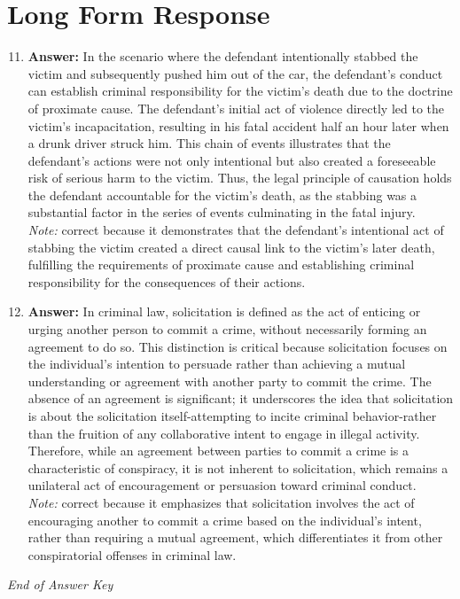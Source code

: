 \documentclass[12pt]{article}
\begin{document}
\section*{Long Form Response}
\begin{enumerate}[label=\arabic*.]
\setcounter{enumi}{10}
\item \textbf{Answer:} In the scenario where the defendant intentionally stabbed the victim and subsequently pushed him out of the car, the defendant's conduct can establish criminal responsibility for the victim's death due to the doctrine of proximate cause. The defendant's initial act of violence directly led to the victim's incapacitation, resulting in his fatal accident half an hour later when a drunk driver struck him. This chain of events illustrates that the defendant's actions were not only intentional but also created a foreseeable risk of serious harm to the victim. Thus, the legal principle of causation holds the defendant accountable for the victim's death, as the stabbing was a substantial factor in the series of events culminating in the fatal injury.
\\ \textit{Note:} correct because it demonstrates that the defendant's intentional act of stabbing the victim created a direct causal link to the victim's later death, fulfilling the requirements of proximate cause and establishing criminal responsibility for the consequences of their actions.
\item \textbf{Answer:} In criminal law, solicitation is defined as the act of enticing or urging another person to commit a crime, without necessarily forming an agreement to do so. This distinction is critical because solicitation focuses on the individual's intention to persuade rather than achieving a mutual understanding or agreement with another party to commit the crime. The absence of an agreement is significant; it underscores the idea that solicitation is about the solicitation itself-attempting to incite criminal behavior-rather than the fruition of any collaborative intent to engage in illegal activity. Therefore, while an agreement between parties to commit a crime is a characteristic of conspiracy, it is not inherent to solicitation, which remains a unilateral act of encouragement or persuasion toward criminal conduct.
\\ \textit{Note:} correct because it emphasizes that solicitation involves the act of encouraging another to commit a crime based on the individual's intent, rather than requiring a mutual agreement, which differentiates it from other conspiratorial offenses in criminal law.
\end{enumerate}

\vfill
\noindent\textit{End of Answer Key}
\end{document}
